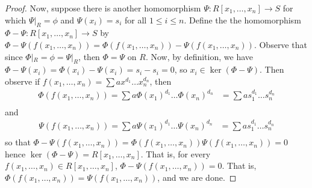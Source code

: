 \begin{proof}
  Now, suppose there is another homomorphism $\Psi:R[x_1, \dots, x_n]
  \xrightarrow{} S$ for which $\Psi|_R=\phi$ and $\Psi(x_i)=s_i$ for
  all $1 \leq i \leq n$. Define the the homomorphism $\Phi-\Psi:R[x_1,
  \dots, x_n] \xrightarrow{} S$ by $\Phi-\Psi(f(x_1, \dots,
  x_n))=\Phi(f(x_1, \dots, x_n))-\Psi(f(x_1, \dots, x_n))$. Observe
  that since $\Phi|_R=\phi=\Psi|_R$, then $\Phi=\Psi$ on $R$. Now, by
  definition, we have $\Phi-\Psi(x_i)=\Phi(x_i)-\Psi(x_i)=s_i-s_i=0$,
  so $x_i \in \ker{(\Phi-\Psi)}$. Then observe if $f(x_1, \dots,
  x_n)=\sum{ax^{d_1} \dots x_n^{d_n}}$, then
  \begin{align*}
    \Phi(f(x_1, \dots, x_n))=\sum{a\Phi(x_1)^{d_1} \dots \Phi(x_n)^{d_n}}
    &= \sum{as_1^{d_1} \dots s_n^{d_n}} \\
  \end{align*}
  and
  \begin{align*}
    \Psi(f(x_1, \dots, x_n))=\sum{a\Psi(x_1)^{d_1} \dots \Psi(x_n)^{d_n}}
    &= \sum{as_1^{d_1} \dots s_n^{d_n}} \\
  \end{align*}
  so that $\Phi-\Psi(f(x_1, \dots, x_n))=\Phi(f(x_1, \dots,
  x_n))\Psi(f(x_1, \dots, x_n))=0$ hence $\ker{(\Phi-\Psi)}=R[x_1,
  \dots, x_n]$. That is, for every $f(x_1, \dots, x_n) \in R[x_1,
  \dots, x_n]$, $\Phi-\Psi(f(x_1, \dots, x_n))=0$. That is,
  $\Phi(f(x_1, \dots, x_n))=\Psi(f(x_1, \dots, x_n))$, and we are
  done.
\end{proof}
